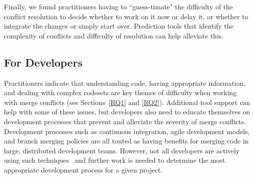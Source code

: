 Finally, we found practitioners having to ``guess-timate" the difficulty of the conflict resolution to decide whether to work on it now or delay it, or whether to integrate the changes or simply start over. 
Prediction tools that identify the complexity of conflicts and difficulty of resolution can help alleviate this.

\subsection{For Developers}
Practitioners indicate that understanding code, having appropriate information, and dealing with complex codesets are key themes of difficulty when working with merge conflicts (see Sections~\ref{RQ1} and \ref{RQ2}).
Additional tool support can help with some of these issues, but developers also need to educate themselves on development processes that prevent and alleviate the severity of merge conflicts.
Development processes such as continuous integration, agile development models, and branch merging policies are all touted as having benefits for merging code in large, distributed development teams. 
However, not all developers are actively using such techniques~\cite{phillips2011branching} and further work is needed to determine the most appropriate development process for a given project.